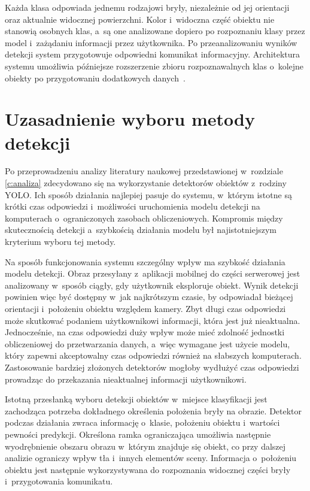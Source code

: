 Każda klasa odpowiada jednemu rodzajowi bryły, niezależnie od jej orientacji oraz aktualnie widocznej powierzchni. Kolor i~widoczna część obiektu nie stanowią osobnych klas, a~są one analizowane dopiero po rozpoznaniu klasy przez model i~zażądaniu informacji przez użytkownika. Po przeanalizowaniu wyników detekcji system przygotowuje odpowiedni komunikat informacyjny. Architektura systemu umożliwia późniejsze rozszerzenie zbioru rozpoznawalnych klas o~kolejne obiekty po przygotowaniu dodatkowych danych~.

\section{Uzasadnienie wyboru metody detekcji}

Po przeprowadzeniu analizy literatury naukowej przedstawionej w~rozdziale \ref{c:analiza} zdecydowano się na wykorzystanie detektorów obiektów z~rodziny YOLO. Ich sposób działania najlepiej pasuje do systemu, w~którym istotne są krótki czas odpowiedzi i~możliwości uruchomienia modelu detekcji na komputerach o~ograniczonych zasobach obliczeniowych. Kompromis między skutecznością detekcji a~szybkością działania modelu był najistotniejszym kryterium wyboru tej metody.

Na sposób funkcjonowania systemu szczególny wpływ ma szybkość działania modelu detekcji. Obraz przesyłany z~aplikacji mobilnej do części serwerowej jest analizowany w~sposób ciągły, gdy użytkownik eksploruje obiekt. Wynik detekcji powinien więc być dostępny w~jak najkrótszym czasie, by odpowiadał bieżącej orientacji i~położeniu obiektu względem kamery. Zbyt długi czas odpowiedzi może skutkować podaniem użytkownikowi informacji, która jest już nieaktualna. Jednocześnie, na czas odpowiedzi duży wpływ może mieć zdolność jednostki obliczeniowej do przetwarzania danych, a~więc wymagane jest użycie modelu, który zapewni akceptowalny czas odpowiedzi również na słabszych komputerach.  Zastosowanie bardziej złożonych detektorów mogłoby wydłużyć czas odpowiedzi prowadząc do przekazania nieaktualnej informacji użytkownikowi.

Istotną przesłanką wyboru detekcji obiektów w~miejsce klasyfikacji jest zachodząca potrzeba dokładnego określenia położenia bryły na obrazie. Detektor podczas działania zwraca informację o~klasie, położeniu obiektu i~wartości pewności predykcji. Określona ramka ograniczająca umożliwia następnie wyodrębnienie obszaru obrazu w~którym znajduje się obiekt, co przy dalszej analizie ograniczy wpływ tła i~innych elementów sceny. Informacja o~położeniu obiektu jest następnie wykorzystywana do rozpoznania widocznej części bryły i~przygotowania komunikatu.

